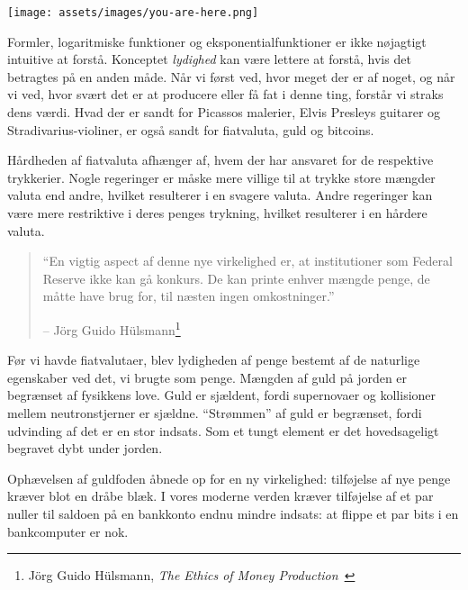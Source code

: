 \begin{center}
  \texttt{[image: assets/images/you-are-here.png]}
  \label{fig:you-are-here.png}
\end{center}

Formler, logaritmiske funktioner og eksponentialfunktioner er ikke nøjagtigt
intuitive at forstå. Konceptet \textit{lydighed} kan være lettere at
forstå, hvis det betragtes på en anden måde. Når vi først ved, hvor meget der er
af noget, og når vi ved, hvor svært det er at producere eller
få fat i denne ting, forstår vi straks dens værdi. Hvad der er sandt for
Picassos malerier, Elvis Presleys guitarer og Stradivarius-violiner,
er også sandt for fiatvaluta, guld og bitcoins.

Hårdheden af fiatvaluta afhænger af, hvem der har ansvaret for
de respektive trykkerier. Nogle regeringer er måske mere villige til at
trykke store mængder valuta end andre, hvilket resulterer i en svagere
valuta. Andre regeringer kan være mere restriktive i deres penges
trykning, hvilket resulterer i en hårdere valuta.

\begin{samepage}\begin{quotation}
\enquote{En vigtig aspect af denne nye virkelighed er, at institutioner som
Federal Reserve ikke kan gå konkurs. De kan printe enhver mængde penge, de
måtte have brug for, til næsten ingen omkostninger.}
\begin{flushright} -- Jörg Guido Hülsmann\footnote{Jörg Guido Hülsmann, \textit{The
Ethics of Money Production}~\cite{hulsmann2008ethics}}
\end{flushright}\end{quotation}\end{samepage}

Før vi havde fiatvalutaer, blev lydigheden af penge bestemt af
de naturlige egenskaber ved det, vi brugte som penge. Mængden
af guld på jorden er begrænset af fysikkens love. Guld er sjældent, fordi
supernovaer og kollisioner mellem neutronstjerner er sjældne. \enquote{Strømmen} af guld er
begrænset, fordi udvinding af det er en stor indsats. Som et tungt element
er det hovedsageligt begravet dybt under jorden.

Ophævelsen af guldfoden åbnede op for en ny virkelighed: tilføjelse af nye penge
kræver blot en dråbe blæk. I vores moderne verden kræver tilføjelse af et par
nuller til saldoen på en bankkonto endnu mindre indsats: at flippe et par bits i en
bankcomputer er nok.

